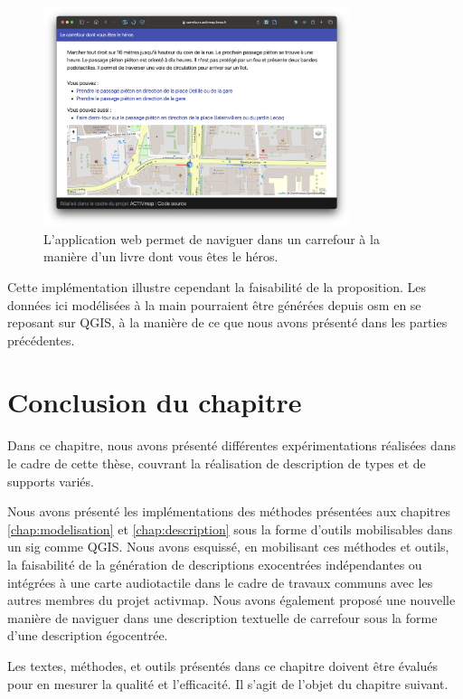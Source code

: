 \begin{figure}[ht]
    \centering
    \includegraphics[width=0.8\textwidth]{images/experimentation/carrefour_heros.png}
    \caption[Démonstrateur de navigation virtuelle dans un carrefour]{L'application web permet de naviguer dans un carrefour à la manière d'un livre dont vous êtes le héros.}
    \label{fig:experimentation_egocentre_screen}
\end{figure}

\newpar{}

Cette implémentation illustre cependant la faisabilité de la proposition. Les données ici modélisées à la main pourraient être générées depuis \gls{osm} en se reposant sur QGIS, à la manière de ce que nous avons présenté dans les parties précédentes.

\section{Conclusion du chapitre}

Dans ce chapitre, nous avons présenté différentes expérimentations réalisées dans le cadre de cette thèse, couvrant la réalisation de description de types et de supports variés.

\newpar{}

Nous avons présenté les implémentations des méthodes présentées aux chapitres \ref{chap:modelisation} et \ref{chap:description} sous la forme d'outils mobilisables dans un \gls{sig} comme QGIS. Nous avons esquissé, en mobilisant ces méthodes et outils, la faisabilité de la génération de descriptions exocentrées indépendantes ou intégrées à une carte audiotactile dans le cadre de travaux communs avec les autres membres du projet \gls{activmap}. Nous avons également proposé une nouvelle manière de naviguer dans une description textuelle de carrefour sous la forme d'une description égocentrée.

\newpar{}

Les textes, méthodes, et outils présentés dans ce chapitre doivent être évalués pour en mesurer la qualité et l'efficacité. Il s'agit de l'objet du chapitre suivant.